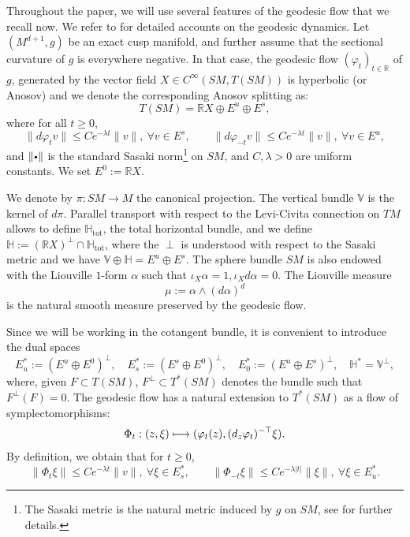 \documentclass[JEP,XML,SOM,Unicode,NoFloatCountersInSection]{cedram}
\newcommand\mto{\mathchoice{\longmapsto}{\mapsto}{\mapsto}{\mapsto}}
\newcommand{\sbullet}{{\scriptscriptstyle\bullet}}
\newcommand{\csbullet}{{\raisebox{1pt}{$\sbullet$}}}
\newcommand{\R}{\mathbb{R}}
\newcommand{\V}{\mathbb{V}}
\newcommand{\HH}{\mathbb{H}}
\theoremstyle{plain}
\theoremstyle{definition}
\begin{document}
Throughout the paper, we will use several features of the geodesic flow that we recall now. We refer to \cite{Paternain-99, Knieper-02} for detailed accounts on the geodesic dynamics. Let $(M^{d+1},g)$ be an exact cusp manifold, and further assume that the sectional curvature of $g$ is everywhere negative. In that case, the geodesic flow $(\varphi_t)_{t \in \R}$ of $g$, generated by the vector field $X \in C^\infty(SM,T(SM))$ is hyperbolic (or Anosov) and we denote the corresponding Anosov splitting as:
\[
T(SM)=\R X \oplus E^u \oplus E^s,
\]
where for all $t \geq 0$,
\begin{equation}
\|d\varphi_{t} v\| \leq C e^{-\lambda t} \|v\|,\ \forall v \in E^{s}, \qquad \|d\varphi_{- t} v\| \leq C e^{-\lambda t} \|v\|,\ \forall v \in E^{u},
\end{equation}
and $\|\csbullet\|$ is the standard Sasaki norm\footnote{The Sasaki metric is the natural metric induced by $g$ on $SM$, see \cite[Ch.\,1]{Paternain-99} for further details.} on $SM$, and $C,\lambda > 0$ are uniform constants. We set $E^0 := \R X$.

We denote by $\pi:SM\to M$ the canonical projection. The vertical bundle $\V$ is the kernel of $d\pi$. Parallel transport with respect to the Levi-Civita connection on $TM$ allows to define $\HH_{\mathrm{tot}}$, the total horizontal bundle, and we define $\HH := (\R X)^\perp \cap \HH_{\mathrm{tot}}$, where the $\perp$ is understood with respect to the Sasaki metric and we have $\V\oplus\HH = E^u\oplus E^s$. The sphere bundle $SM$ is also endowed with the Liouville $1$-form $\alpha$ such that $\iota_X \alpha = 1, \iota_X d \alpha = 0$. The Liouville measure
\begin{equation}
\label{equation:liouville}
\mu := \alpha \wedge (d\alpha)^d
\end{equation}
is the natural smooth measure preserved by the geodesic flow.

Since we will be working in the cotangent bundle, it is convenient to introduce the dual spaces
\[
E^\ast_u:= (E^u\oplus E^0)^\perp,\quad E^\ast_s := (E^s \oplus E^0)^\perp,\quad E^\ast_0:= (E^u\oplus E^s)^\perp,\quad \HH^\ast = \V^\perp,
\]
where, given $F \subset T(SM)$, $F^\perp \subset T^*(SM)$ denotes the bundle such that $F^\perp(F)=0$.
The geodesic flow has a natural extension to $T^\ast(SM)$ as a flow of symplectomorphisms:
\begin{equation}
\label{equation:symp}
\Phi_t:(z, \xi) \mto (\varphi_t(z), (d_z\varphi_{t})^{-\top} \xi).
\end{equation}
By definition, we obtain that for $t\geq 0$,
\begin{equation}\label{eq:costable-counstable}
\|\Phi_{t} \xi\| \leq C e^{-\lambda t} \|v\|,\ \forall \xi \in E^\ast_{s}, \qquad \|\Phi_{- t} \xi\| \leq C e^{-\lambda |t|} \|\xi\|,\ \forall \xi \in E^\ast_{u}.
\end{equation}
\end{document}
